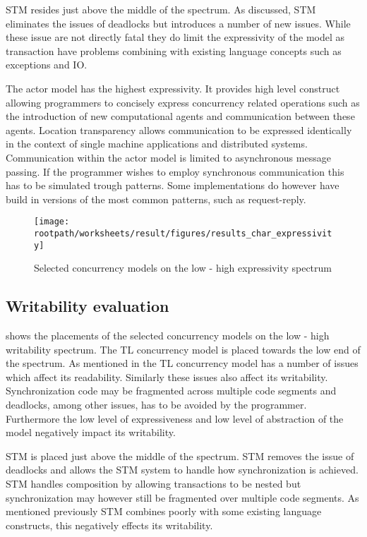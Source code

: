 \ac{STM} resides just above the middle of the spectrum. As discussed, \ac{STM} eliminates the issues of deadlocks but introduces a number of new issues. While these issue are not directly fatal they do limit the expressivity of the model as transaction have problems combining with existing language concepts such as exceptions and \ac{IO}.

The actor model has the highest expressivity. It provides high level construct allowing programmers to concisely express concurrency related operations such as the introduction of new computational agents and communication between these agents. Location transparency allows communication to be expressed identically in the context of single machine applications and distributed systems. Communication within the actor model is limited to asynchronous message passing. If the programmer wishes to employ synchronous communication this has to be simulated trough patterns. Some implementations do however have build in versions of the most common patterns, such as request-reply.

\begin{figure}[htbp]
\centering
 \texttt{[image: \\rootpath/worksheets/result/figures/results\_char\_expressivity]} 
 \caption{Selected concurrency models on the low - high expressivity spectrum}
\label{fig:results_char_expressivity}
\end{figure}

\subsection{Writability evaluation}
 shows the placements of the selected concurrency models on the low - high writability spectrum. The \ac{TL} concurrency model is placed towards the low end of the spectrum. As mentioned in  the \ac{TL} concurrency model has a number of issues which affect its readability. Similarly these issues also affect its writability. Synchronization code may be fragmented across multiple code segments and deadlocks, among other issues, has to be avoided by the programmer. Furthermore the low level of expressiveness and low level of abstraction of the model negatively impact its writability.

\ac{STM} is placed just above the middle of the spectrum. \ac{STM} removes the issue of deadlocks and allows the \ac{STM} system to handle how synchronization is achieved. \ac{STM} handles composition by allowing transactions to be nested but synchronization may however still be fragmented over multiple code segments. As mentioned previously \ac{STM} combines poorly with some existing language constructs, this negatively effects its writability.

